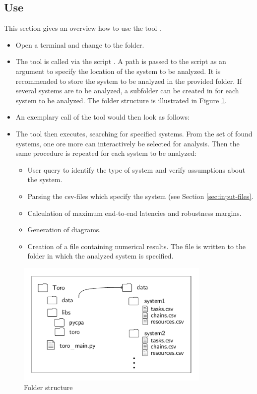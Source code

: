 \subsection{Use}
This section gives an overview how to use the tool \Tool.
\begin{itemize}
\item Open a terminal and change to the  folder.	
\item The tool \Tool is called via the script .
A path is passed to the script as an argument to specify the location of the system to be analyzed.
It is recommended to store the system to be analyzed in the provided  folder.
If several systems are to be analyzed, a subfolder can be created in  for each system to be analyzed. 
The folder structure is illustrated in Figure \ref{fig:structure}.
\item An exemplary call of the tool would then look as follows:
\begin{tcolorbox}
\end{tcolorbox}
%
\item The tool \Tool then executes, searching for specified systems. 
From the set of found systems, one ore more can interactively be selected for analysis.
Then the same procedure is repeated for each system to be analyzed:
\begin{itemize}
	\item User query to identify the type of system and verify assumptions about the system.
	\item Parsing the csv-files which specify the system (see Section \ref{sec:input-files}.
	\item Calculation of maximum end-to-end latencies and robustness margins.
	\item Generation of diagrams.
	\item Creation of a file containing numerical results.  
	The file is written to the folder in which the analyzed system is specified.
\end{itemize}
\end{itemize}
%
\begin{figure}[t]
		\centering
				\includegraphics[trim=0.5cm 0.5cm 0.5cm 0.5cm, height=6cm]{fig/structure.pdf}
		\caption{Folder structure}
		\label{fig:structure}
\end{figure}
%


